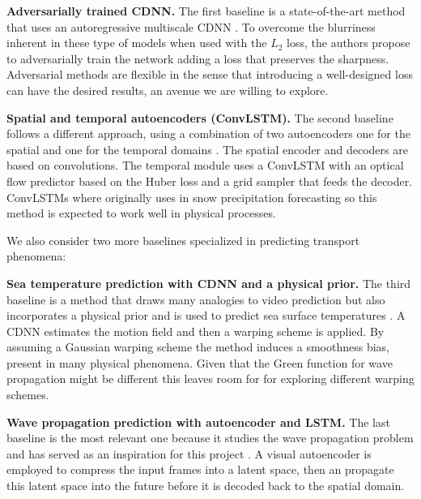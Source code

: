 \documentclass[a4paper,11pt]{article}
\begin{document}
\textbf{Adversarially trained CDNN.} The first baseline is a state-of-the-art method that uses an autoregressive multiscale CDNN \cite{mathieu2015deep}. To overcome the blurriness inherent in these type of models when used with the $L_2$ loss, the authors propose to adversarially train the network adding a loss that preserves the sharpness. Adversarial methods are flexible in the sense that introducing a well-designed loss can have the desired results, an avenue we are willing to explore.


\textbf{Spatial and temporal autoencoders (ConvLSTM).} The second baseline follows a different approach, using a combination of two autoencoders one for the spatial and one for the temporal domains \cite{patraucean2015spatio}. The spatial encoder and decoders are based on convolutions. The temporal module uses a ConvLSTM \cite{xingjian2015convolutional} with an optical flow predictor based on the Huber loss and a grid sampler that feeds the decoder. ConvLSTMs where originally uses in snow precipitation forecasting so this method is expected to work well in physical processes.

We also consider two more baselines specialized in predicting transport phenomena:

\textbf{Sea temperature prediction with CDNN and a physical prior.} The third baseline is a method that draws many analogies to video prediction but also incorporates a physical prior and is used to predict sea surface temperatures  \cite{bezenac2017deep}. A CDNN estimates the motion field and then a warping scheme is applied. By assuming a Gaussian warping scheme the method induces a smoothness bias, present in many physical phenomena. Given that the Green function for wave propagation might be different this leaves room for for exploring different warping schemes.

\textbf{Wave propagation prediction with autoencoder and LSTM.} The last baseline is the most relevant one because it studies the wave propagation problem and has served as an inspiration for this project \cite{sorteberg2018approximating}. A visual autoencoder is employed to compress the input frames into a latent space, then an  propagate this latent space into the future before it is decoded back to the spatial domain. 
\end{document}

